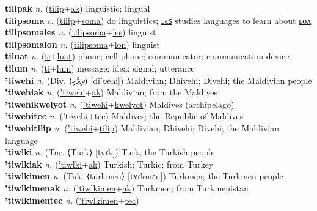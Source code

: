 \textbf{tilipak} \textit{n.} (\hyperref[tilip]{tilip}+\hyperref[ak]{ak})
linguistic; lingual \label{tilipak} \\
\textbf{tilipsoma} \textit{v.} (\hyperref[tilip]{tilip}+\hyperref[soma]{soma})
do linguistics; \hyperref[tilipsomales]{ʟєꜱ} studies languages to learn about \hyperref[tilipsomalon]{ʟᴏᴧ} \label{tilipsoma} \\
\textbf{tilipsomales} \textit{n.} (\hyperref[tilipsoma]{tilipsoma}+\hyperref[les]{les})
linguist \label{tilipsomales} \\
\textbf{tilipsomalon} \textit{n.} (\hyperref[tilipsoma]{tilipsoma}+\hyperref[lon]{lon})
linguist \label{tilipsomalon} \\
\textbf{tiluat} \textit{n.} (\hyperref[ti]{ti}+\hyperref[luat]{luat})
phone; cell phone; communicator; communication device \label{tiluat} \\
\textbf{tilum} \textit{n.} (\hyperref[ti]{ti}+\hyperref[lum]{lum})
message; idea; signal; utterance \label{tilum} \\
\textbf{'tiwehi} \textit{n.} (Div. ⟨ދިވެހި⟩ [diˈʋehi])
Maldivian; Dhivehi; Divehi; the Maldivian people \label{'tiwehi} \\
\textbf{'tiwehiak} \textit{n.} (\hyperref['tiwehi]{'tiwehi}+\hyperref[ak]{ak})
Maldivian; from the Maldives \label{'tiwehiak} \\
\textbf{'tiwehikwelyot} \textit{n.} (\hyperref['tiwehi]{'tiwehi}+\hyperref[kwelyot]{kwelyot})
Maldives (archipelago) \label{'tiwehikwelyot} \\
\textbf{'tiwehitec} \textit{n.} (\hyperref['tiwehi]{'tiwehi}+\hyperref[tec]{tec})
Maldives; the Republic of Maldives \label{'tiwehitec} \\
\textbf{'tiwehitilip} \textit{n.} (\hyperref['tiwehi]{'tiwehi}+\hyperref[tilip]{tilip})
Maldivian; Dhivehi; Divehi; the Maldivian language \label{'tiwehitilip} \\
\textbf{'tiwlki} \textit{n.} (Tur. ⟨Türk⟩ [tyɾk])
Turk; the Turkish people \label{'tiwlki} \\
\textbf{'tiwlkiak} \textit{n.} (\hyperref['tiwlki]{'tiwlki}+\hyperref[ak]{ak})
Turkish; Turkic; from Turkey \label{'tiwlkiak} \\
\textbf{'tiwlkimen} \textit{n.} (Tuk. ⟨türkmen⟩ [tʏɾkmɛn])
Turkmen; the Turkmen people \label{'tiwlkimen} \\
\textbf{'tiwlkimenak} \textit{n.} (\hyperref['tiwlkimen]{'tiwlkimen}+\hyperref[ak]{ak})
Turkmen; from Turkmenistan \label{'tiwlkimenak} \\
\textbf{'tiwlkimentec} \textit{n.} (\hyperref['tiwlkimen]{'tiwlkimen}+\hyperref[tec]{tec})
